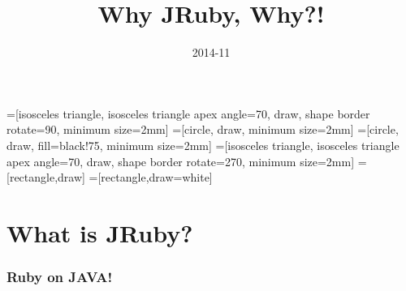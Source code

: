 \usepackage{etex}
\usepackage[english]{babel}

\usepackage[all]{xy}
\usepackage[latin1]{inputenc}

\usepackage{palatino,courier}
\usepackage{amsfonts,amssymb}
\usepackage[mathscr]{euscript}
\usepackage{stmaryrd}
\usepackage{eulervm}

\usepackage{proof}
\usepackage{amsmath}
\usepackage{xspace}

\usepackage{graphicx}
\usepackage{tikz}
\usetikzlibrary{calc,arrows,positioning,shapes.geometric,fit,decorations.markings}


\tikzset{ node distance=.1mm, inner sep=0.5mm}

=[isosceles triangle, isosceles triangle apex angle=70, draw, shape border rotate=90, minimum size=2mm]
=[circle, draw, minimum size=2mm]
=[circle, draw, fill=black!75, minimum size=2mm]
=[isosceles triangle, isosceles triangle apex angle=70, draw, shape border rotate=270, minimum size=2mm]
=[rectangle,draw]
=[rectangle,draw=white]




\title{Why JRuby, Why?!}

\author[Brett~Giles]{}



\date
{2014-11}

\subject{JRuby}








\begin{frame}
  \titlepage
\end{frame}

\section{What is JRuby?}
\begin{frame}\frametitle{Ruby on JAVA!}

\end{frame}





